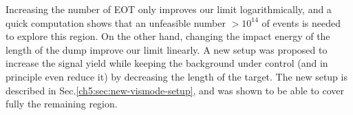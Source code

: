 Increasing the number of EOT only improves our limit logarithmically, and a quick computation shows that an unfeasible number $>10^{14}$ of events is needed to explore this region. On the other hand, changing the impact energy of the length of the dump improve our limit linearly. A new setup was proposed to increase the signal yield while keeping the background under control (and in principle even reduce it) by decreasing the length of the target. The new setup is described in Sec.\ref{ch5:sec:new-vismode-setup}, and was shown to be able to cover fully the remaining region.


